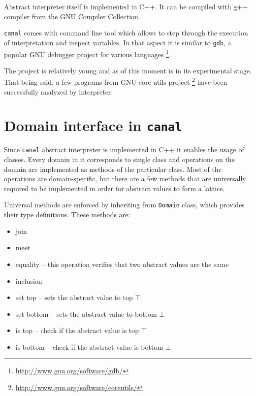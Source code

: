 \documentclass[12pt,final,oneside]{fithesis2}
\theoremstyle{definition}
\begin{document}
Abstract interpreter itself is implemented in C++. It can be compiled with
g++ compiler from the GNU Compiler Collection.

\texttt{canal} comes with command line tool which allows to step through
the execution of interpretation and inspect variables. In that aspect it
is similar to \texttt{gdb}, a popular GNU debugger project for various
languages \footnote{\url{http://www.gnu.org/software/gdb/}}.

The project is relatively young and as of this moment is in its experimental
stage. That being said, a few programs from GNU core utils project
\footnote{\url{http://www.gnu.org/software/coreutils/}} have been
successfully analyzed by interpreter.


\section{Domain interface in \texttt{canal}}

Since \texttt{canal} abstract interpreter is implemented in C++ it enables
the usage of classes. Every domain in it corresponds to single class and
operations on the domain are implemented as methods of the particular class.
Most of the operations are domain-specific, but there are a few methods
that are universally required to be implemented in order for abstract
values to form a lattice.

Universal methods are enforced by inheriting from \texttt{Domain} class,
which provides their type definitions. These methods are:

\begin{itemize}

\item join

\item meet

\item equality -- this operation verifies that two abstract values are the same

\item inclusion --

\item set top -- sets the abstract value to top $\top$

\item set bottom -- sets the abstract value to bottom $\bot$

\item is top -- check if the abstract value is top $\top$

\item is bottom -- check if the abstract value is bottom $\bot$

\end{itemize}
\end{document}
